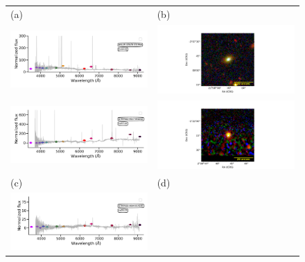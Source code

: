 \documentclass[fleqn,usenatbib]{mnras}
\begin{document}
{\begin{figure}
  \setlength\tabcolsep{0pt}
  \begin{tabular}{ll}
    (a) & (b) \\
    \includegraphics[trim=10 0 10 20, clip]{Figs/spec-57313-EG220318S020919M01_sp10-173-SPLUS-s03s05-011958.pdf}
    & \includegraphics[width=0.4\linewidth, trim=10 0 10 20, clip]{Figs/SPLUS-s03s05-011958_329-3_100_r.pdf} \\
    \includegraphics[trim=10 0 10 20, clip]{Figs/spec-55893-F9304_sp15-198-STRIPE82-0057-001810.pdf}
    & \includegraphics[width=0.4\linewidth, trim=10 0 10 20, clip]{Figs/STRIPE82-0057-001810_39-1_100_r.pdf} \\
    (c) & (d) \\
    \includegraphics[trim=10 0 10 20, clip]{Figs/spec-57336-EG034838N001340M01_sp09-025-STRIPE82-0084-014280.pdf}

\end{tabular}
\end{figure}}
\end{document}

